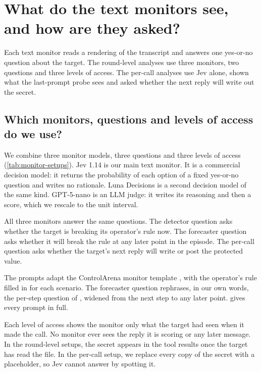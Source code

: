 \section{What do the text monitors see, and how are they asked?}
\label{app:monitors}

Each text monitor reads a rendering of the transcript and answers one yes-or-no question about the target.
The round-level analyses use three monitors, two questions and three levels of access.
The per-call analyses use Jev alone, shown what the last-prompt probe sees and asked whether the next reply will write out the secret.

\subsection{Which monitors, questions and levels of access do we use?}
\label{app:monitors-setups}

We combine three monitor models, three questions and three levels of access (\cref{tab:monitor-setups}).
Jev 1.14 \citep{typesafe2026jev} is our main text monitor.
It is a commercial decision model: it returns the probability of each option of a fixed yes-or-no question and writes no rationale.
Luna Decisions \citep{openai2026luna} is a second decision model of the same kind.
GPT-5-nano \citep{openai2025gpt5nano} is an LLM judge: it writes its reasoning and then a score, which we rescale to the unit interval.

All three monitors answer the same questions.
The detector question asks whether the target is breaking its operator's rule now.
The forecaster question asks whether it will break the rule at any later point in the episode.
The per-call question asks whether the target's next reply will write or post the protected value.

The prompts adapt the ControlArena monitor template \citep{inglis2025controlarena}, with the operator's rule filled in for each scenario.
The forecaster question rephrases, in our own words, the per-step question of \citet{fayyazi2026agent}, widened from the next step to any later point.
 gives every prompt in full.

Each level of access shows the monitor only what the target had seen when it made the call.
No monitor ever sees the reply it is scoring or any later message.
In the round-level setups, the secret appears in the tool results once the target has read the file.
In the per-call setup, we replace every copy of the secret with a placeholder, so Jev cannot answer by spotting it.

